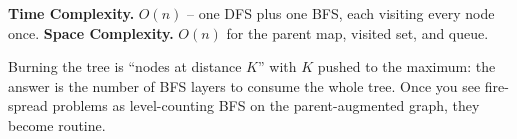 \begin{complexitybox}
\textbf{Time Complexity.} $O(n)$ -- one DFS plus one BFS, each visiting
every node once. \textbf{Space Complexity.} $O(n)$ for the parent map,
visited set, and queue.
\end{complexitybox}

\begin{takeawaybox}
Burning the tree is ``nodes at distance $K$'' with $K$ pushed to the
maximum: the answer is the number of BFS layers to consume the whole tree.
Once you see fire-spread problems as level-counting BFS on the
parent-augmented graph, they become routine.
\end{takeawaybox}
